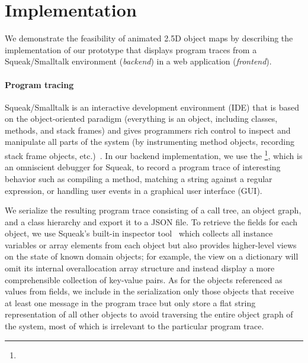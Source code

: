 \section{Implementation}
\label{sec:implementation}

We demonstrate the feasibility of animated 2.5D object maps by describing the implementation of our prototype \tfd{} that displays program traces from a Squeak/Smalltalk environment (\emph{backend}) in a web application (\emph{frontend}).

\paragraph{Program tracing}
\label{sec:implementation/program_tracing}

Squeak/Smalltalk is an interactive development environment (IDE) that is based on the object-oriented paradigm (everything is an object, including classes, methods, and stack frames) and gives programmers rich control to inspect and manipulate all parts of the system (by instrumenting method objects, recording stack frame objects, etc.)~\cite{ingalls1997back,rowledge2001tour,thiede2023squeak}.
In our backend implementation, we use the \tdb{}\footnote{}, which is an omniscient debugger for Squeak, to record a program trace of interesting behavior such as compiling a method, matching a string against a regular expression, or handling user events in a graphical user interface (GUI).

We serialize the resulting program trace consisting of a call tree, an object graph, and a class hierarchy and export it to a JSON file.
To retrieve the fields for each object, we use Squeak's built-in inspector tool~\cite[chap. 6, sec. 3]{thiede2023squeak} which collects all instance variables or array elements from each object but also provides higher-level views on the state of known domain objects; for example, the view on a dictionary will omit its internal overallocation array structure and instead display a more comprehensible collection of key-value pairs.
As for the objects referenced as values from fields, we include in the serialization only those objects that receive at least one message in the program trace but only store a flat string representation of all other objects to avoid traversing the entire object graph of the system, most of which is irrelevant to the particular program trace.

